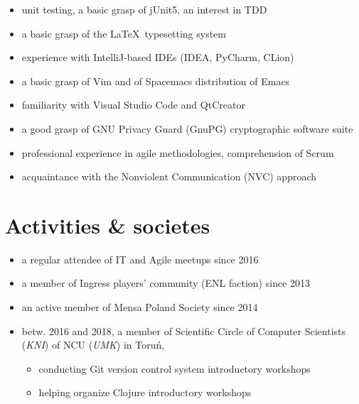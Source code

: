 \documentclass[a4paper]{res}
\begin{document}
\begin{resume}
\begin{itemize}
        \item unit testing, a basic grasp of jUnit5, an interest in TDD
        \vspace{-0.04in}
        \item a basic grasp of the \LaTeX~typesetting system
        \vspace{-0.04in}
        \item experience with IntelliJ-based IDEs (IDEA, PyCharm, CLion)
        \vspace{-0.04in}
        \item a basic grasp of Vim and of Spacemacs distribution of Emacs
        \vspace{-0.04in}
        \item familiarity with Visual Studio Code and QtCreator
        \vspace{-0.04in}
        \item a good grasp of GNU Privacy Guard (GnuPG) cryptographic software suite
        \item professional experience in agile methodologies, comprehension of Scrum
        \vspace{-0.04in}
        \item acquaintance with the Nonviolent Communication (NVC) approach
    \end{itemize}
    \vspace{-0.16in}
    \section{Activities \& societes}
        \vspace{0.14in}
    \begin{itemize}
        \item a regular attendee of IT and Agile meetups since 2016
        \vspace{-0.07in}
        \item a member of Ingress players' community (ENL faction) since 2013
        \vspace{-0.07in}
        \item an active member of Mensa Poland Society since 2014
        \vspace{-0.05in}
        \item \footnotesize betw. 2016 and 2018, a member of {Scientific Circle of Computer Scientists (\textsl{KNI})
        of NCU (\textsl{UMK}) in Toruń},
        \vspace{-0.07in}
        \begin{itemize}
        \vspace{-0.01in}
            \item conducting Git version control system introductory workshops
        \vspace{-0.05in}
            \item helping organize Clojure introductory workshops
        \end{itemize}
    \end{itemize}
\end{resume}
\end{document}
